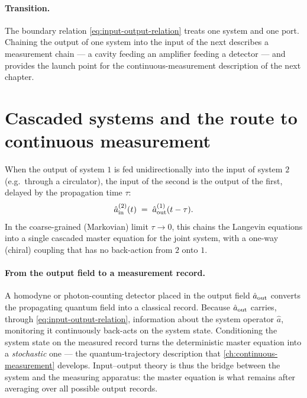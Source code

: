 \paragraph{Transition.}
The boundary relation \cref{eq:input-output-relation} treats one
system and one port. Chaining the output of one system into the
input of the next describes a measurement chain --- a cavity feeding
an amplifier feeding a detector --- and provides the launch point
for the continuous-measurement description of the next chapter.

\section{Cascaded systems and the route to continuous measurement}
\label{sec:cascaded}

\begin{statement}
\label{stmt:cascaded}
When the output of system $1$ is fed unidirectionally into the
input of system $2$ (e.g.\ through a circulator), the input of the
second is the output of the first, delayed by the propagation time
$\tau$:
\begin{equation}
\label{eq:cascade}
\hat a_{\rm in}^{(2)}(t) \;=\; \hat a_{\rm out}^{(1)}(t-\tau).
\end{equation}
In the coarse-grained (Markovian) limit $\tau\to0$, this chains the
Langevin equations into a single cascaded master equation for the
joint system, with a one-way (chiral) coupling that has no
back-action from $2$ onto $1$.
\end{statement}

\paragraph{From the output field to a measurement record.}
A homodyne or photon-counting detector placed in the output field
$\hat a_{\rm out}$ converts the propagating quantum field into a
classical record. Because $\hat a_{\rm out}$ carries, through
\cref{eq:input-output-relation}, information about the system
operator $\hat a$, monitoring it continuously back-acts on the
system state. Conditioning the system state on the measured record
turns the deterministic master equation into a \emph{stochastic}
one --- the quantum-trajectory description that
\cref{ch:continuous-measurement} develops. Input--output theory is
thus the bridge between the system and the measuring apparatus:
the master equation is what remains after averaging over all
possible output records.

